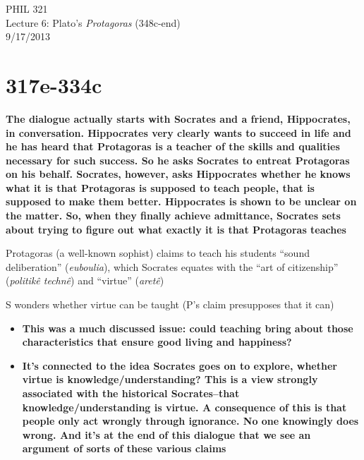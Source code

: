 \documentclass[11pt]{article}
\begin{document}
\thispagestyle{empty}
\begin{center} \LARGE{PHIL 321\\ Lecture 6: Plato's \emph{Protagoras} (348c-end)}\\ \vspace*{2mm}
\large{9/17/2013}\end{center}
\thispagestyle{empty}\vspace*{3mm}
\vspace*{-8mm}

\section*{317e-334c}

\noindent \textbf{The dialogue actually starts with Socrates and a friend, Hippocrates, in conversation. Hippocrates very clearly wants to succeed in life and he has heard that Protagoras is a teacher of the skills and qualities necessary for such success. So he asks Socrates to entreat Protagoras on his behalf. Socrates, however, asks Hippocrates whether he knows what it is that Protagoras is supposed to teach people, that is supposed to make them better. Hippocrates is shown to be unclear on the matter. So, when they finally achieve admittance, Socrates sets about trying to figure out what exactly it is that Protagoras teaches}
\vspace*{2mm}

\noindent Protagoras (a well-known sophist) claims to teach his students ``sound deliberation'' (\emph{euboulia}), which Socrates equates with the ``art of citizenship'' (\emph{politik\^{e} techn\^{e}}) and ``virtue'' (\emph{aret\^{e}})
\vspace*{2mm}

\noindent S wonders whether virtue can be taught (P's claim presupposes that it can)

\begin{itemize}\item{\textbf{This was a much discussed issue: could teaching bring about those characteristics that ensure good living and happiness?}}\item{\textbf{It's connected to the idea Socrates goes on to explore, whether virtue is knowledge/understanding? This is a view strongly associated with the historical Socrates--that knowledge/understanding is virtue. A consequence of this is that people only act wrongly through ignorance. No one knowingly does wrong. And it's at the end of this dialogue that we see an argument of sorts of these various claims}}\end{itemize}
\vspace*{2mm}
\end{document}
